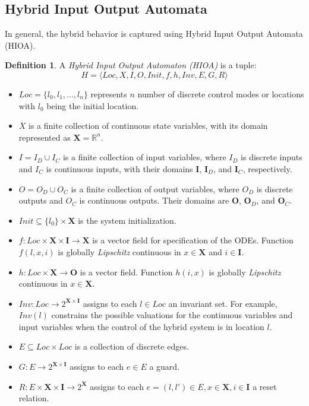 \documentclass[twoside,a4paper,12pt]{article}
\theoremstyle{definition}
\newtheorem{definition}{Definition}
\begin{document}
\subsection{Hybrid Input Output Automata}
In general, the hybrid behavior is captured using Hybrid Input Output Automata (HIOA).
\begin{definition}
	A \emph{Hybrid Input Output Automaton (HIOA)} is a tuple:
	\begin{equation}
	H = \langle Loc, X, I, O, Init, f, h, Inv, E, G, R \rangle
	\end{equation}
	\begin{itemize}
		\item $Loc = \{ l_0, l_1, ... , l_n\}$ represents $n$ number of discrete
		control modes or locations with $l_0$ being the initial location.
		\item $X$ is a finite collection of continuous state variables, with its domain represented as $\mathbf{X} = \mathbb{R}^n$.
		\item $I = I_D \cup I_C$ is a finite collection of input variables, where $I_D$ is discrete inputs and $I_C$ is continuous inputs, with their domains $\mathbf{I}$, $\mathbf{I}_D$, and $\mathbf{I}_C$, respectively.
		\item $O = O_D \cup O_C$ is a finite collection of output variables, where
		$O_D$ is discrete outputs and $O_C$ is continuous outputs. Their domains are $\mathbf{O}$, $\mathbf{O}_D$, and $\mathbf{O}_C$.
		\item $Init \subseteq \{l_0\} \times \mathbf{X}$ is the system initialization.
		\item $f:Loc \times \mathbf{X} \times \mathbf{I} \rightarrow \mathbf{X}$ is a vector field for specification of the ODEs. Function $f(l,x,i)$ is globally \emph{Lipschitz} continuous in $x \in \mathbf{X}$ and $i \in \mathbf{I}$.
		\item $h : Loc \times \mathbf{X} \rightarrow \mathbf{O}$ is a vector field. Function $h(i,x)$ is globally \emph{Lipschitz} continuous in $ x\in \mathbf{X}$.
		\item $Inv : Loc \rightarrow 2^{ \mathbf{X} \times \mathbf{I} }$ assigns to each $l \in Loc$ an invariant set. For example, $Inv(l)$ constrains the possible valuations for the continuous variables and input variables when the control of the hybrid system is in location $l$.
		\item $E \subseteq Loc \times Loc$ is a collection of discrete edges.
		\item $G : E \rightarrow 2^{ \mathbf{X} \times \mathbf{I} }$ assigns to each $e \in E$ a guard.
		\item $R : E \times \mathbf{X} \times \mathbf{I} \rightarrow 2^{\mathbf{X}}$ assigns to each $e = (l,l')\in E, x\in \mathbf{X}, i \in \mathbf{I}$ a reset relation.
	\end{itemize}
	\label{def:HIOA}
\end{definition}
\end{document}
